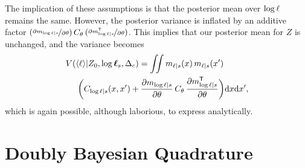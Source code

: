 \documentclass{article}
\begin{document}
 
The implication of these assumptions is that the posterior mean over $\tr$ remains the same. However, the posterior variance is inflated by an additive factor
$
(\npderiv{m_{\tr|s}}{\theta})\,C_\theta\,(\npderiv{m\tra_{\tr|s}}{\theta})
$. 
This implies that our posterior mean for $Z$ is unchanged, and the variance becomes
\begin{align*}
  &\cov{\inty{\lfn}}{Z_0,\tvr_s,\Delta_c}=
 \iint m_{\lfn|s}(\lfv)\, m_{\lfn|s}(\lfv')\\
&  
\hspace{0.5cm}\biggl(C_{\tr|s}(\lfv,\lfv') + \pderiv{m_{\tr|s}}{\theta}\,C_\theta\,\pderiv{m\tra_{\tr|s}}{\theta}\biggr)
 \ud \lfv \ud\lfv',
\end{align*}
which is again possible, although laborious, to express analytically.



\section{Doubly Bayesian Quadrature}
\end{document}
